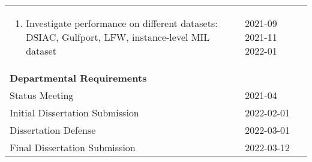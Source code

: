 \begin{longtable}{|p{10cm}|p{4cm}|}
\begin{enumerate}
		\item  Investigate performance on different datasets: DSIAC, Gulfport, LFW, instance-level MIL dataset
	\end{enumerate} & \newline \vspace{0.2cm} 2021-09 \newline \vspace{1.2cm} 2021-11 \newline \vspace{2.1cm} 2022-01 \\

	\multicolumn{2}{|l|}{\textbf{Departmental Requirements}} \\
	\hline
	Status Meeting & 2021-04\\
	\hline
	Initial Dissertation Submission & 2022-02-01\\
	\hline
	Dissertation Defense & 2022-03-01\\
	\hline
	Final Dissertation Submission & 2022-03-12\\

\end{longtable}

